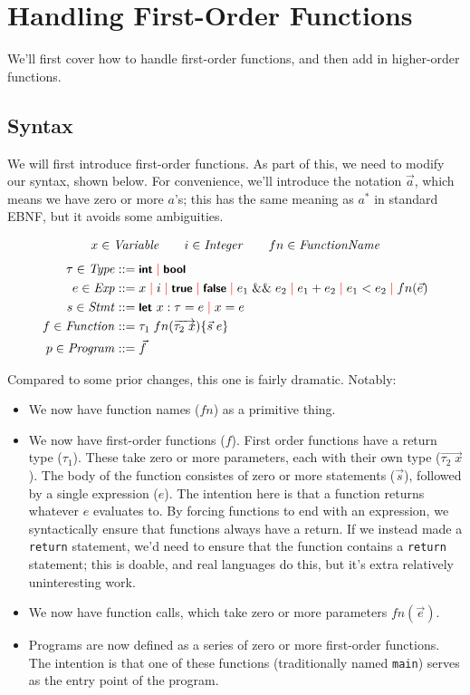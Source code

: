 \section{Handling First-Order Functions}
We'll first cover how to handle first-order functions, and then add in higher-order functions.

\subsection{Syntax}
We will first introduce first-order functions.
As part of this, we need to modify our syntax, shown below.
For convenience, we'll introduce the notation $\vec{a}$, which means we have zero or more $a$'s; this has the same meaning as $a^*$ in standard EBNF, but it avoids some ambiguities.

\begin{gather*}
  x \in \mathit{Variable} \qquad i \in \mathit{Integer} \qquad fn \in \mathit{FunctionName}
\end{gather*}
\begin{align*}
  \tau \in \mathit{Type} &::= \mbox{\sffamily{\bfseries\small {int}}} \; {\color{red}\mid}\; \mbox{\sffamily{\bfseries\small {bool}}}\\
  e \in \mathit{Exp} &::= x \; {\color{red}\mid}\; i \; {\color{red}\mid}\; \mbox{\sffamily{\bfseries\small {true}}} \; {\color{red}\mid}\; \mbox{\sffamily{\bfseries\small {false}}} \; {\color{red}\mid}\; e_1 \;\&\&\; e_2 \; {\color{red}\mid}\; e_1 + e_2 \; {\color{red}\mid}\; e_1 < e_2 \; {\color{red}\mid}\; fn(\vec{e})\\
  s \in \mathit{Stmt} &::= \mbox{\sffamily{\bfseries\small {let }}} x: \tau = e \; {\color{red}\mid}\; x = e\\
  f \in \mathit{Function} &::= \tau_1\;fn(\overrightarrow{\tau_2\;x}) \{ \vec{s}\;e \}\\
  p \in \mathit{Program} &::= \vec{f}
\end{align*}

Compared to some prior changes, this one is fairly dramatic.
Notably:
\begin{itemize}
\item We now have function names ($fn$) as a primitive thing.
\item We now have first-order functions ($f$).
  First order functions have a return type ($\tau_1$).
  These take zero or more parameters, each with their own type ($\overrightarrow{\tau_2\;x}$).
  The body of the function consistes of zero or more statements ($\vec{s}$), followed by a single expression ($e$).
  The intention here is that a function returns whatever $e$ evaluates to.
  By forcing functions to end with an expression, we syntactically ensure that functions always have a return.
  If we instead made a \texttt{return} statement, we'd need to ensure that the function contains a \texttt{return} statement; this is doable, and real languages do this, but it's extra relatively uninteresting work.
\item We now have function calls, which take zero or more parameters $fn(\vec{e})$.
\item Programs are now defined as a series of zero or more first-order functions.
  The intention is that one of these functions (traditionally named \texttt{main}) serves as the entry point of the program.
\end{itemize}

